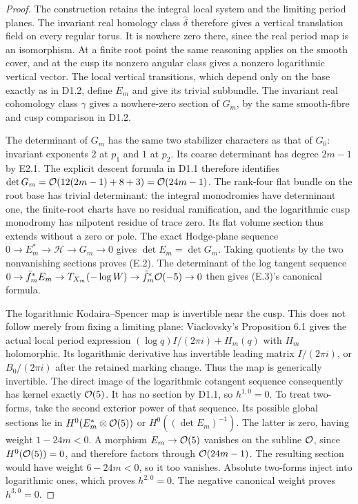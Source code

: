 \begin{proof}
The construction retains the integral local system and the limiting
period planes. The invariant real homology class $\widehat\delta$
therefore gives a vertical translation field on every regular torus.
It is nowhere zero there, since the real period map is an isomorphism.
At a finite root point the same reasoning applies on the smooth
cover, and at the cusp its nonzero angular class gives a nonzero
logarithmic vertical vector. The local vertical transitions, which
depend only on the base exactly as in D1.2, define $E_m$ and give its
trivial subbundle. The invariant real cohomology class $\gamma$ gives
a nowhere-zero section of $G_m$, by the same smooth-fibre and cusp
comparison in D1.2.

The determinant of $G_m$ has the same two stabilizer characters as
that of $G_0$: invariant exponents $2$ at $p_1$ and $1$ at $p_2$.
Its coarse determinant has degree $2m-1$ by E2.1. The explicit descent
formula in D1.1 therefore identifies
$\det G_m=\mathcal O(12(2m-1)+8+3)=\mathcal O(24m-1)$.
The rank-four flat bundle on the root base has trivial determinant:
the integral monodromies have determinant one, the finite-root charts
have no residual ramification, and the logarithmic cusp monodromy
has nilpotent residue of trace zero. Its flat volume section thus
extends without a zero or pole. The exact Hodge-plane sequence
$0\to E_m^*\to\mathcal H\to G_m\to0$ gives
$\det E_m=\det G_m$. Taking quotients by the two nonvanishing
sections proves (E.2). The determinant of the log tangent sequence
$0\to\bar f_m^*E_m\to T_{X_m}(-\log W)
\to\bar f_m^*\mathcal O(-5)\to0$ then gives (E.3)'s canonical formula.

The logarithmic Kodaira--Spencer map is invertible near the cusp.
This does not follow merely from fixing a limiting plane:
Viaclovsky's Proposition 6.1 gives the actual local period expression
$(\log q)I/(2\pi i)+H_m(q)$ with $H_m$ holomorphic. Its logarithmic
derivative has invertible leading matrix $I/(2\pi i)$, or
$B_0/(2\pi i)$ after the retained marking change. Thus the map is
generically invertible. The direct image of the logarithmic
cotangent sequence consequently has kernel exactly $\mathcal O(5)$.
It has no section by D1.1, so $h^{1,0}=0$. To treat two-forms, take
the second exterior power of that sequence. Its possible global
sections lie in
$H^0(E_m^*\otimes\mathcal O(5))$ or
$H^0((\det E_m)^{-1})$.
The latter is zero, having weight $1-24m<0$. A morphism
$E_m\to\mathcal O(5)$ vanishes on the subline $\mathcal O$, since
$H^0(\mathcal O(5))=0$, and therefore factors through $\mathcal O(24m-1)$.
The resulting section would have weight $6-24m<0$, so it too
vanishes. Absolute two-forms inject into logarithmic ones, which
proves $h^{2,0}=0$. The negative canonical weight proves $h^{3,0}=0$.


\end{proof}
